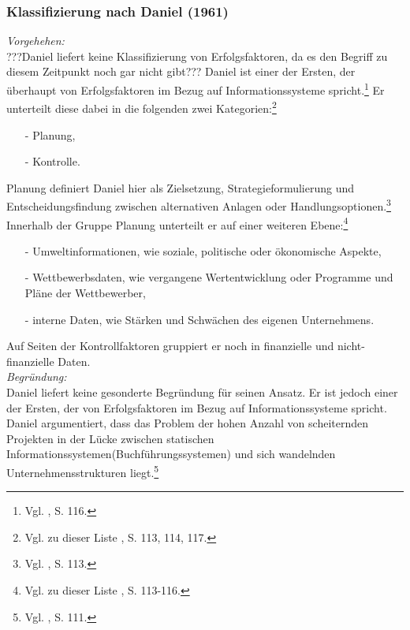 \noindent
\subsubsection{Klassifizierung nach Daniel (1961)}
\textit{Vorgehehen:}\\\noindent
???Daniel liefert keine Klassifizierung von Erfolgsfaktoren, da es den Begriff zu diesem Zeitpunkt noch gar nicht gibt???
Daniel ist einer der Ersten, der überhaupt von Erfolgsfaktoren im Bezug auf Informationssysteme spricht.\footnote{Vgl. \cite{Daniel.1961}, S. 116.}
Er unterteilt diese dabei in die folgenden zwei Kategorien:\footnote{Vgl. zu dieser Liste \cite{Daniel.1961}, S. 113, 114, 117.}
\begin{itemize}\itemsep0pt
\item[-]Planung,
\item[-]Kontrolle.
\end{itemize}
Planung definiert Daniel hier als Zielsetzung, Strategieformulierung und Entscheidungsfindung zwischen alternativen
Anlagen oder Handlungsoptionen.\footnote{Vgl. \cite{Daniel.1961}, S. 113.}
Innerhalb der Gruppe Planung unterteilt er auf einer weiteren Ebene:\footnote{Vgl. zu dieser Liste \cite{Daniel.1961}, S. 113-116.}
\begin{itemize}\itemsep0pt
\item[-]Umweltinformationen, wie soziale, politische oder ökonomische Aspekte,
\item[-]Wettbewerbsdaten, wie vergangene Wertentwicklung oder Programme und Pläne der Wettbewerber,
\item[-]{interne Daten, wie Stärken und Schwächen des eigenen Unternehmens.}
\end{itemize}
Auf Seiten der Kontrollfaktoren gruppiert er noch in finanzielle und nicht-finanzielle Daten.
\\\noindent
\textit{Begründung:}\\\noindent
Daniel liefert keine gesonderte Begründung für seinen Ansatz. Er ist jedoch einer der Ersten, der von Erfolgsfaktoren im Bezug auf 
Informationssysteme spricht.
Daniel argumentiert, dass das Problem der hohen Anzahl von scheiternden Projekten in der Lücke zwischen statischen Informationssystemen(Buchführungssystemen) und
sich wandelnden Unternehmensstrukturen liegt.\footnote{Vgl. \cite{Daniel.1961}, S. 111.}